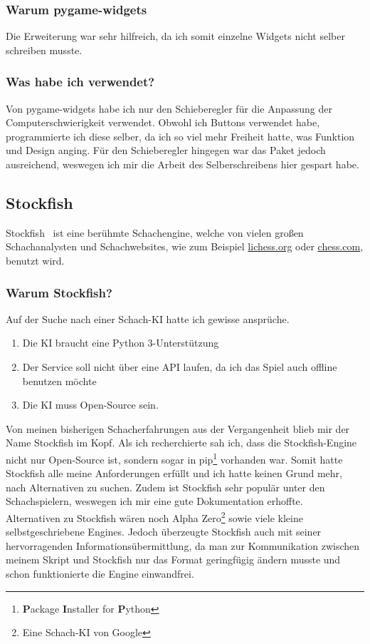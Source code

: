 \documentclass[a4paper, 10pt]{scrartcl}
\begin{document}
\subsubsection*{Warum pygame-widgets}
Die Erweiterung war sehr hilfreich, da ich somit einzelne Widgets nicht selber schreiben musste.

\subsubsection*{Was habe ich verwendet?}
Von \glqq pygame-widgets\grqq{} habe ich nur den Schieberegler für die Anpassung der Computerschwierigkeit verwendet. Obwohl ich Buttons verwendet
habe, programmierte ich diese selber, da ich so viel mehr Freiheit hatte, was Funktion und Design anging. Für den Schieberegler hingegen
war das Paket jedoch ausreichend, weswegen ich mir die Arbeit des Selberschreibens hier gespart habe.

\subsection{Stockfish}
\glqq Stockfish\grqq~\cite{Stockfish} ist eine berühmte Schachengine, welche von vielen großen Schachanalysten und Schachwebsites, wie zum Beispiel \url{lichess.org} oder \url{chess.com}, benutzt wird.

\subsubsection*{Warum Stockfish?}
Auf der Suche nach einer Schach-KI hatte ich gewisse ansprüche.
\begin{enumerate}
        \item Die KI braucht eine Python 3-Unterstützung
        \item Der Service soll nicht über eine API laufen, da ich das Spiel auch
        offline benutzen möchte
        \item Die KI muss Open-Source sein.
\end{enumerate}
Von meinen bisherigen Schacherfahrungen aus der Vergangenheit blieb mir
der Name \glqq Stockfish\grqq{} im Kopf. Als ich recherchierte sah ich, dass die 
\glqq Stockfish\grqq{}-Engine nicht nur Open-Source ist, sondern sogar in pip\footnote{\textbf{P}ackage \textbf{I}nstaller for \textbf{P}ython} vorhanden war.
Somit hatte \glqq Stockfish\grqq{} alle meine Anforderungen erfüllt und ich hatte keinen Grund mehr,
nach Alternativen zu suchen.
Zudem ist \glqq Stockfish\grqq{} sehr populär unter den Schachspielern, weswegen ich mir eine
gute Dokumentation erhoffte.\\
Alternativen zu \glqq Stockfish\grqq{} wären noch Alpha Zero\footnote{Eine Schach-KI von Google}
sowie viele kleine selbstgeschriebene Engines. Jedoch überzeugte \glqq Stockfish\grqq{} auch mit
seiner hervorragenden Informationsübermittlung, da man zur Kommunikation zwischen
meinem Skript und \glqq Stockfish\grqq{} nur das Format geringfügig ändern musste und schon funktionierte
die Engine einwandfrei.  
\end{document}
